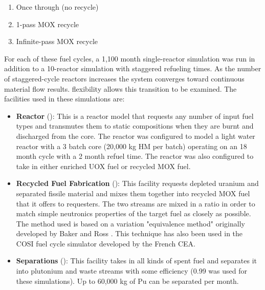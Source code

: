 \begin{enumerate}
    \item Once through (no recycle)
    \item 1-pass \gls{MOX} recycle
    \item Infinite-pass \gls{MOX} recycle
\end{enumerate}

For each of these fuel cycles, a 1,100 month single-reactor \Cyclus simulation
was run in addition to a 10-reactor simulation with staggered refueling times.
As the number of staggered-cycle reactors increases the system converges
toward continuous material flow results.  \Cyclus flexibility allows this
transition to be examined.  The facilities used in these simulations are:

\begin{itemize}

    \item \textbf{Reactor} (): This is a reactor
        model that requests any number of input fuel types and transmutes them
        to static compositions when they are burnt and discharged from the
        core. The reactor was configured to model a light water reactor
        with a 3 batch core (20,000 kg HM per batch) operating on an 18 month
        cycle with a 2 month refuel time.  The reactor was also configured to
        take in either enriched \gls{UOX} fuel or recycled \gls{MOX} fuel.

    \item \textbf{Recycled Fuel Fabrication} (): This
        facility requests depleted uranium and separated fissile material and
        mixes them together into recycled \gls{MOX} fuel that it offers to
        requesters.  The two streams are mixed in a ratio in order to match
        simple neutronics properties of the target fuel as closely as
        possible.  The method used is based on a variation "equivalence
        method" originally developed by Baker and Ross
        \cite{baker_comparison_1963}.  This technique has also been used in the
        \gls{COSI} fuel cycle simulator developed by the French \gls{CEA}.

    \item \textbf{Separations} (): This facility
        takes in all kinds of spent fuel and separates it into plutonium and
        waste streams with some efficiency (0.99 was used for these
        simulations).  Up to 60,000 kg of Pu can be separated per month.


\end{itemize}
